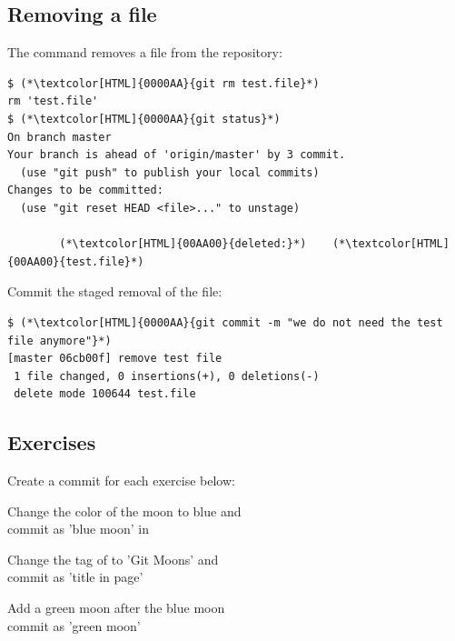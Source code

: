 \subsection{Removing a file}
\begin{frame}[fragile]
\subslidetitle
  The command  removes a file from the repository:
\begin{lstlisting}
$ (*\textcolor[HTML]{0000AA}{git rm test.file}*)
rm 'test.file'
$ (*\textcolor[HTML]{0000AA}{git status}*)
On branch master
Your branch is ahead of 'origin/master' by 3 commit.
  (use "git push" to publish your local commits)
Changes to be committed:
  (use "git reset HEAD <file>..." to unstage)

        (*\textcolor[HTML]{00AA00}{deleted:}*)    (*\textcolor[HTML]{00AA00}{test.file}*)
\end{lstlisting}

  Commit the staged removal of the file:
  \begin{lstlisting}
$ (*\textcolor[HTML]{0000AA}{git commit -m "we do not need the test file anymore"}*)
[master 06cb00f] remove test file
 1 file changed, 0 insertions(+), 0 deletions(-)
 delete mode 100644 test.file
\end{lstlisting}

\end{frame}

\subsection{Exercises}
\begin{frame}[fragile]
\subslidetitle
  Create a commit for each exercise below:
  \begin{exercise}
    \item Change the color of the moon to blue and\\
      commit as 'blue moon' in 
    \item Change the  tag of  to 'Git Moons' and\\
      commit as 'title in page'
    \item Add a green moon after the blue moon\\
      commit as 'green moon'
  \end{exercise}

\end{frame}

